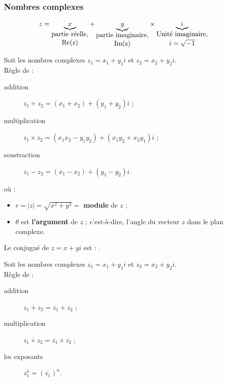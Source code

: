\documentclass[10pt, french]{article}
\begin{document}
\begin{multicols*}{2}
\subsubsection{Nombres complexes}
\begin{align*}
	z	&=	\underbrace{x}_{\shortstack{partie réelle,\\ \text{Re}(z)}} + \underbrace{y}_{\shortstack{partie imaginaire,\\ \text{Im}(z)}}\times\underbrace{i}_{\shortstack{Unité imaginaire,\\ $i = \sqrt{-1}$}}
\end{align*}

\begin{definitionNOHFILLpropos}
Soit les nombres complexes $z_{1}	=	x_{1} + y_{1}i$ et $z_{2}	=	x_{2} + y_{2}i$.\\
Règle de : 
\begin{description}
	\item[addition]	$z_{1} + z_{2}	=	(x_{1} + x_{2}) + (y_{1} + y_{2})i$ ;
	\item[multiplication]	$z_{1} \times z_{2}	=	(x_{1}x_{2} - y_{1}y_{2}) + (x_{1}y_{2} + x_{2}y_{1})i$ ;
	\item[soustraction]		$z_{1} - z_{2}	=	(x_{1} - x_{2}) + (y_{1} - y_{2})i$.
\end{description}
\end{definitionNOHFILLpropos}


\begin{definitionNOHFILLprop}
 où : 
\begin{itemize}
	\item	$r	=	|z|	=	\sqrt{x^{2} + y^{2}}	=$ \textbf{module} de $z$ ;
	\item	$\theta$	est \textbf{l'argument} de $z$ ; c'est-à-dire, l'angle du vecteur $z$ dans le plan complexe.
\end{itemize}
\end{definitionNOHFILLprop}

\begin{definitionNOHFILLprop}
Le conjugué de $z	=	x + yi$ est : .

\begin{definitionNOHFILLpropos}
Soit les nombres complexes $z_{1}	=	x_{1} + y_{1}i$ et $z_{2}	=	x_{2} + y_{2}i$.\\
Règle de : 
\begin{description}
	\item[addition]	$\overline{z_{1} + z_{2}}	=	\overline{z_{1}} + \overline{z_{2}}$ ;
	\item[multiplication]	$\overline{z_{1} \times z_{2}}	=	\overline{z_{1}} \times \overline{z_{2}}$ ;
	\item[les exposants]		$\overline{z_{1}^{n}}	=	\left(\overline{z_{1}}\right)^{n}$.
\end{description}
\end{definitionNOHFILLpropos}
\end{definitionNOHFILLprop}



\end{multicols*}
\end{document}

